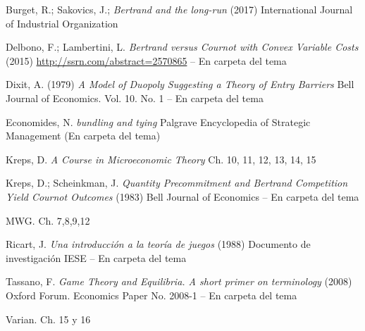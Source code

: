 \documentclass{nuevotema}
\begin{document}
Burget, R.; Sakovics, J.; \textit{Bertrand and the long-run} (2017) International Journal of Industrial Organization

Delbono, F.; Lambertini, L. \textit{Bertrand versus Cournot with Convex Variable Costs} (2015) \url{http://ssrn.com/abstract=2570865} -- En carpeta del tema

Dixit, A. (1979) \textit{A Model of Duopoly Suggesting a Theory of Entry Barriers} Bell Journal of Economics. Vol. 10. No. 1 -- En carpeta del tema

Economides, N. \textit{bundling and tying} Palgrave Encyclopedia of Strategic Management (En carpeta del tema)

Kreps, D. \textit{A Course in Microeconomic Theory} Ch. 10, 11, 12, 13, 14, 15

Kreps, D.; Scheinkman, J. \textit{Quantity Precommitment and Bertrand Competition Yield Cournot Outcomes} (1983) Bell Journal of Economics -- En carpeta del tema

MWG. Ch. 7,8,9,12

Ricart, J. \textit{Una introducción a la teoría de juegos} (1988) Documento de investigación IESE -- En carpeta del tema

Tassano, F. \textit{Game Theory and Equilibria. A short primer on terminology} (2008) Oxford Forum. Economics Paper No. 2008-1 -- En carpeta del tema

Varian. Ch. 15 y 16
\end{document}
